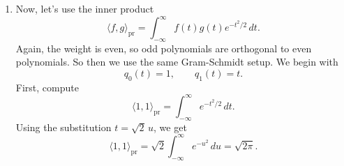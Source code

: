 \documentclass[10pt]{extarticle}
\begin{document}
\begin{enumerate}[label=(\alph*)]
For the quartic one, parity tells us we only need to subtract the even earlier polynomials:
\[
p_4(t)=t^4-\frac{\langle t^4,p_2\rangle_{\mathrm{ph}}}{\langle p_2,p_2\rangle_{\mathrm{ph}}}p_2
-\frac{\langle t^4,p_0\rangle_{\mathrm{ph}}}{\langle p_0,p_0\rangle_{\mathrm{ph}}}p_0.
\]
\[
\langle t^4,p_0\rangle_{\mathrm{ph}}
=\int_{-\infty}^{\infty} t^4e^{-t^2}\,dt
=\frac{3}{4}\sqrt{\pi},
\qquad
\langle p_0,p_0\rangle_{\mathrm{ph}}=\sqrt{\pi}.
\]
So the coefficient on $p_0$ is
\[
\frac{\langle t^4,p_0\rangle_{\mathrm{ph}}}{\langle p_0,p_0\rangle_{\mathrm{ph}}}
=\frac{3}{4}.
\]
Next,
\[
\langle p_2,p_2\rangle_{\mathrm{ph}}
=\int_{-\infty}^{\infty} \left(t^2-\frac{1}{2}\right)^2e^{-t^2}\,dt.
\]
Expanding gives
\[
\langle p_2,p_2\rangle_{\mathrm{ph}}
=\int_{-\infty}^{\infty} \left(t^4-t^2+\frac{1}{4}\right)e^{-t^2}\,dt
=\frac{3}{4}\sqrt{\pi}-\frac{1}{2}\sqrt{\pi}+\frac{1}{4}\sqrt{\pi}
=\frac{1}{2}\sqrt{\pi}.
\]
Also,
\[
\langle t^4,p_2\rangle_{\mathrm{ph}}
=\int_{-\infty}^{\infty} t^4\left(t^2-\frac{1}{2}\right)e^{-t^2}\,dt
=\int_{-\infty}^{\infty} \left(t^6-\frac{1}{2}t^4\right)e^{-t^2}\,dt.
\]
So we still need
\[
\int_{-\infty}^{\infty} t^6e^{-t^2}\,dt.
\]
Use integration by parts once more with
\[
u=t^5,\qquad dv=te^{-t^2}\,dt.
\]
Then,
\[
du=5t^4\,dt,\qquad v=-\frac{1}{2}e^{-t^2},
\]
which gives
\[
\int_{-\infty}^{\infty} t^6e^{-t^2}\,dt
=\left[-\frac{1}{2}t^5e^{-t^2}\right]_{-\infty}^{\infty}
+\frac{5}{2}\int_{-\infty}^{\infty} t^4e^{-t^2}\,dt
=\frac{15}{8}\sqrt{\pi}.
\]
Therefore,
\[
\langle t^4,p_2\rangle_{\mathrm{ph}}
=\frac{15}{8}\sqrt{\pi}-\frac{1}{2}\cdot\frac{3}{4}\sqrt{\pi}
=\frac{3}{2}\sqrt{\pi},
\]
so the coefficient on $p_2$ is
\[
\frac{\langle t^4,p_2\rangle_{\mathrm{ph}}}{\langle p_2,p_2\rangle_{\mathrm{ph}}}
=\frac{\frac{3}{2}\sqrt{\pi}}{\frac{1}{2}\sqrt{\pi}}
=3.
\]
Putting that together,
\[
p_4(t)=t^4-3\left(t^2-\frac{1}{2}\right)-\frac{3}{4}
=t^4-3t^2+\frac{3}{4}.
\]

So the first five monic physicists' Hermite polynomials are
\[
1,\qquad
t,\qquad
t^2-\frac{1}{2},\qquad
t^3-\frac{3}{2}t,\qquad
t^4-3t^2+\frac{3}{4}.
\]

\item Now, let's use the inner product
\[
\langle f,g\rangle_{\mathrm{pr}}
=\int_{-\infty}^{\infty} f(t)g(t)e^{-t^2/2}\,dt.
\]
Again, the weight is even, so odd polynomials are orthogonal to even polynomials. So then we use the same Gram-Schmidt setup. We begin with
\[
q_0(t)=1,
\qquad
q_1(t)=t.
\]
First, compute
\[
\langle 1,1\rangle_{\mathrm{pr}}
=\int_{-\infty}^{\infty} e^{-t^2/2}\,dt.
\]
Using the substitution $t=\sqrt{2}\,u$, we get
\[
\langle 1,1\rangle_{\mathrm{pr}}
=\sqrt{2}\int_{-\infty}^{\infty} e^{-u^2}\,du
=\sqrt{2\pi}.
\]


\end{enumerate}
\end{document}
